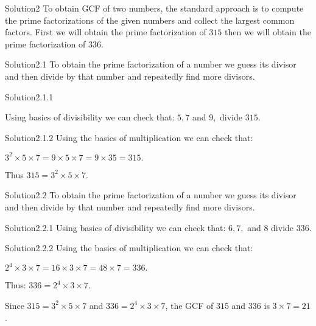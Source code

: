 \documentclass[titlepage]{article}
\begin{document}
\begin{section}{Solution2}
To obtain GCF of two numbers, the standard approach is to compute the prime factorizations of the given numbers and collect the largest common factors.
First we will obtain the prime factorization of $315$ then we will obtain the prime factorization
of $336$.
\begin{subsection}{Solution2.1}
To obtain the prime factorization of a number we guess its divisor
and then divide by that number and repeatedly find more divisors.


\begin{subsubsection}{Solution2.1.1}
\end{subsubsection}
Using basics of divisibility we can check that:
$5, 7$ and $9,$  divide $315$. 

\begin{subsubsection}{Solution2.1.2}
Using the basics of multiplication we can check that:

$3^2 \times 5 \times 7 = 9 \times 5 \times 7 = 9 \times 35 = 315.$
\end{subsubsection}
Thus $315 = 3^2 \times 5 \times 7$.
\end{subsection}
  
  \begin{subsection}{Solution2.2}
  To obtain the prime factorization of a number we guess its divisor
and then divide by that number and repeatedly find more divisors.

 
\begin{subsubsection}{Solution2.2.1}
Using basics of divisibility we can check that:
$6, 7,$ and $8$ divide $336$. 

\end{subsubsection}
\begin{subsubsection}{Solution2.2.2}
Using the basics of multiplication we can check that:

$2^4 \times 3 \times 7 = 16 \times 3 \times 7 = 48 \times 7 = 336.$

\end{subsubsection}
Thus: $336 = 2^4 \times 3 \times 7$.
\end{subsection}

Since $315 = 3^2 \times 5 \times 7$ and $336 = 2^4 \times 3 \times 7$,
the GCF of $315$ and $336$ is $3 \times 7 = 21$.

\end{section}
\end{document}
